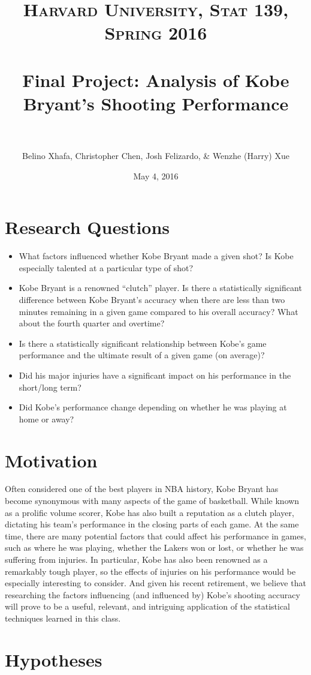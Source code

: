\documentclass[paper=a4, fontsize=11pt]{scrartcl} %
\title{ 
\normalfont \normalsize 
\textsc{Harvard University, Stat 139, Spring 2016} \\ [25pt] %
\horrule{0.5pt} \\[0.4cm] %
\huge Final Project: Analysis of Kobe Bryant's Shooting Performance \\ %
\horrule{2pt} \\[0.5cm] %
}
\author{Belino Xhafa, Christopher Chen, Josh Felizardo, \& Wenzhe (Harry) Xue}
\date{\normalsize May 4, 2016} %
\numberwithin{equation}{section} %
\numberwithin{figure}{section} %
\numberwithin{table}{section} %
\begin{document}
\maketitle %
\section{Research Questions}
\begin{itemize}
	\item What factors influenced whether Kobe Bryant made a given shot? Is Kobe especially talented at a particular type of shot?
	\item Kobe Bryant is a renowned ``clutch'' player. Is there a statistically significant difference between Kobe Bryant's accuracy when there are less than two minutes remaining in a given game compared to his overall accuracy? What about the fourth quarter and overtime?
	\item Is there a statistically significant relationship between Kobe's game performance and the ultimate result of a given game (on average)?
	\item Did his major injuries have a significant impact on his performance in the short/long term?
	\item Did Kobe's performance change depending on whether he was playing at home or away?
\end{itemize}
\section{Motivation}
\hspace*{1cm}Often considered one of the best players in NBA history, Kobe Bryant has become synonymous with many aspects of the game of basketball. While known as a prolific volume scorer, Kobe has also built a reputation as a clutch player, dictating his team's performance in the closing parts of each game. At the same time, there are many potential factors that could affect his performance in games, such as where he was playing, whether the Lakers won or lost, or whether he was suffering from injuries. In particular, Kobe has also been renowned as a remarkably tough player, so the effects of injuries on his performance would be especially interesting to consider. And given his recent retirement, we believe that researching the factors influencing (and influenced by) Kobe's shooting accuracy will prove to be a useful, relevant, and intriguing application of the statistical techniques learned in this class. 
\section{Hypotheses}
\end{document}
